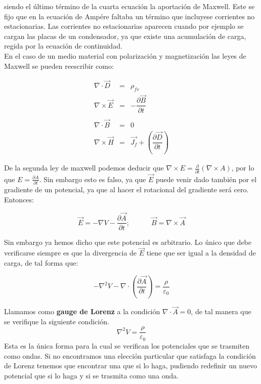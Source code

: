 \documentclass[12pt]{article}
\newcommand{\parentesis}[1]{\left( #1  \right)}
\newcommand{\parciales}[2]{\frac{\partial #1}{\partial #2}}
\newcommand{\tquad}{\quad \quad \quad}
\newcommand{\rota}{\nabla \times}
\newcommand{\dive}{\nabla \cdot}
\begin{document}
siendo el último término de la cuarta ecuación la aportación de Maxwell. Este se fijo que en la ecuación de Ampére faltaba un término que incluyese corrientes no estacionarias. Las corrientes no estacionarias aparecen cuando por ejemplo se cargan las placas de un condensador, ya que existe una acumulación de carga, regida por la ecuación de continuidad. \\

En el caso de un medio material con polarización y magnetización las leyes de Maxwell se pueden reescribir como:


\begin{equation}
\begin{array}{lll}
\nabla \cdot \vec{D} & = & \rho_{fv} \\ 

\nabla \times \vec{E} & = & - \dfrac{\partial \vec{B}}{\partial t} \\ \\

\nabla \cdot \vec{B} & = & 0 \\ 

\nabla \times \vec{H} & = &  \vec{J_f} + \parentesis{\dfrac{\partial \vec{D}}{\partial t}}

\end{array}
\end{equation}

De la segunda ley de maxwell podemos deducir que $\rota E = \parciales{}{t} \parentesis{\rota A}$, por lo que $E = \parciales{A}{t}$. Sin embargo esto es falso, ya que $\vec{E}$ puede venir dado también por el gradiente de un potencial, ya que al hacer el rotacional del gradiente será cero. Entonces:

\begin{equation}
\vec{E} = -  \nabla V - \parciales{\vec{A}}{t} ; \tquad \vec{B} = \rota \vec{A}
\end{equation}

Sin embargo ya hemos dicho que este potencial es arbitrario. Lo único que debe verificarse siempre es que la divergencia de $\vec{E}$ tiene que ser igual a la densidad de carga, de tal forma que:

\begin{equation}
-\nabla^2 V - \dive \parentesis{\parciales{\vec{A}}{t}} = \dfrac{\rho}{\varepsilon_0}
\end{equation}

Llamamos como \textbf{gauge de Lorenz} a la condición $\dive \vec{A} = 0$, de tal manera que se verifique la siguiente condición. $$\nabla^2 V = \dfrac{\rho}{\varepsilon_0}$$ Esta es la única forma para la cual se verifican los potenciales que se trasmiten como ondas. Si no encontramos una elección particular que satisfaga la condición de Lorenz tenemos que encontrar una que si lo haga, pudiendo redefinir un nuevo potencial que si lo haga y si se trasmita como una onda.
\end{document}
